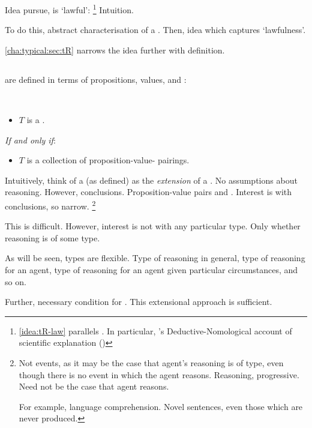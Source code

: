 \begin{note}
  Idea pursue, \tCN{} is `lawful':%
  \footnote{
    \autoref{idea:tR-law} parallels \qWhyV{}.
    In particular, \citeauthor{Hempel:1965aa}'s Deductive-Nomological account of scientific explanation ()
  }
  {
    \color{red}
    Intuition.
  }

  To do this, abstract characterisation of a \tocN{}.
  Then, idea which captures `lawfulness'.

  \autoref{cha:typical:sec:tR} narrows the idea further with definition.
\end{note}

\subsection{}
\label{cha:typical:sec:tR:ToRdef}

\begin{note}
   are defined in terms of propositions, values, and :

  \begin{definition}[\tocN{2}]
    \label{def:tor}
    \mbox{ }
    \vspace{-\baselineskip}
    \begin{itemize}
    \item
      \(T\) is a \emph{}.
    \end{itemize}

    \emph{If and only if}:

    \begin{itemize}
    \item
      \(T\) is a collection of proposition-value-\pool{} pairings.
    \end{itemize}
    \vspace{-\baselineskip}
  \end{definition}

  Intuitively, think of a \tocN{} (as defined) as the \emph{extension} of a \tocN{}.
  No assumptions about reasoning.
  However, conclusions.
  Proposition-value pairs and .
  Interest is with conclusions, so narrow.%
  \footnote{
    Not events, as it may be the case that agent's reasoning is of type, even though there is no event in which the agent reasons.
    Reasoning, progressive.
    Need not be the case that agent reasons.

    For example, language comprehension.
    Novel sentences, even those which are never produced.
  }

  This is difficult.
  However, interest is not with any particular type.
  Only whether reasoning is of some type.

  As will be seen, types are flexible.
  Type of reasoning in general, type of reasoning for an agent, type of reasoning for an agent given particular circumstances, and so on.

  Further, necessary condition for \tC{}.
  This extensional approach is sufficient.
\end{note}

